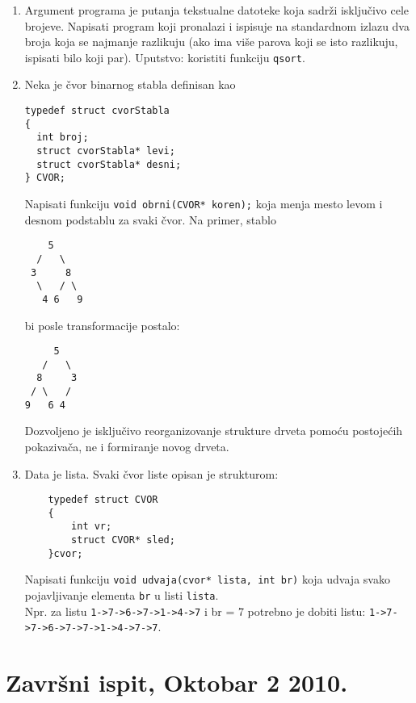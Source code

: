 \begin{enumerate}
\item Argument programa je putanja tekstualne datoteke koja
sadr\v{z}i isklju\v{c}ivo cele brojeve. Napisati program koji
pronalazi i ispisuje na standardnom izlazu dva broja koja se
najmanje razlikuju (ako ima vi\v{s}e parova koji se isto razlikuju,
ispisati bilo koji par). Uputstvo: koristiti funkciju \verb|qsort|.

\item Neka je \v cvor binarnog stabla definisan kao

\begin{verbatim}
typedef struct cvorStabla
{
  int broj;
  struct cvorStabla* levi;
  struct cvorStabla* desni;
} CVOR;
\end{verbatim}

Napisati funkciju \verb|void obrni(CVOR* koren);| koja menja mesto levom
i desnom podstablu za svaki \v cvor. Na primer, stablo

\begin{verbatim}
    5
  /   \
 3     8
  \   / \
   4 6   9
\end{verbatim}

bi posle transformacije postalo:

\begin{verbatim}
     5
   /   \
  8     3
 / \   /
9   6 4
\end{verbatim}

Dozvoljeno je isklju\v civo reorganizovanje strukture drveta pomo\' cu postoje\' cih
pokaziva\v ca, ne i formiranje novog drveta.


\item Data je lista. Svaki \v cvor liste opisan je strukturom:

\begin{verbatim}
    typedef struct CVOR
    {
        int vr;
        struct CVOR* sled;
    }cvor;
\end{verbatim}

    Napisati funkciju \verb|void udvaja(cvor* lista, int br)| koja
    udvaja svako pojavljivanje elementa \verb|br| u listi \verb|lista|. \\
    Npr. za listu \verb|1->7->6->7->1->4->7| i br = 7 potrebno je dobiti listu: \verb|1->7->7->6->7->7->1->4->7->7|.
\end{enumerate}



\section{Zavr\v{s}ni ispit, Oktobar 2 2010.}


